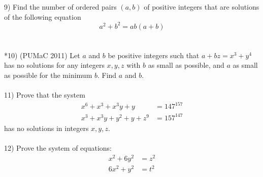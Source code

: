 \documentclass{article}
\begin{document}
9) Find the number of ordered pairs $(a,b)$ of positive integers that are solutions of the following equation
\begin{equation*}
a^2+b^2=ab(a+b)
\end{equation*}
\\
\\
*10) (PUMaC 2011) Let $a$ and $b$ be positive integers such that $a+bz=x^3+y^4$ has no solutions for any integers $x,y,z$ with $b$ as small as possible, and $a$ as small as possible for the minimum $b$. Find $a$ and $b$.
\\
\\
11) Prove that the system
\begin{align*}
x^6+x^3+x^3y+y&=147^{157} \\
x^3+x^3y+y^2+y+z^9&=157^{147}
\end{align*}
has no solutions in integers $x,y,z$.
\\
\\
12) Prove the system of equations:
\begin{align*}
x^2+6y^2&=z^2\\
6x^2+y^2&=t^2
\end{align*}
\end{document}
